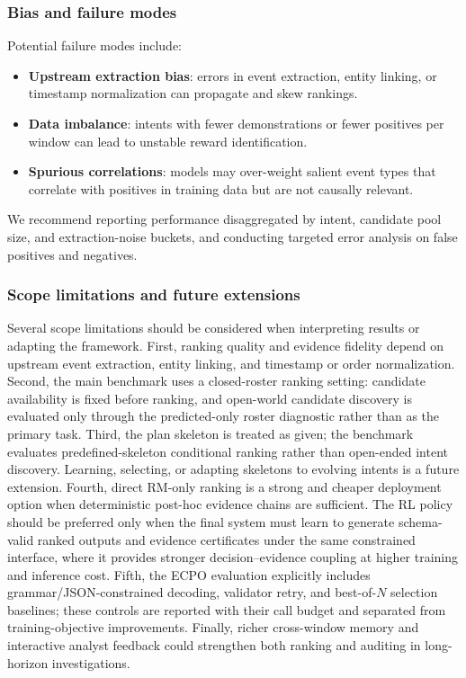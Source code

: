 \documentclass{article}
\begin{document}
\subsubsection{Bias and failure modes}

Potential failure modes include:
\begin{itemize}
    \item \textbf{Upstream extraction bias}: errors in event extraction, entity linking, or timestamp normalization can propagate and skew rankings.
    \item \textbf{Data imbalance}: intents with fewer demonstrations or fewer positives per window can lead to unstable reward identification.
    \item \textbf{Spurious correlations}: models may over-weight salient event types that correlate with positives in training data but are not causally relevant.
\end{itemize}
We recommend reporting performance disaggregated by intent, candidate pool size, and extraction-noise buckets, and conducting targeted error analysis on false positives and negatives.

\subsubsection{Scope limitations and future extensions}

Several scope limitations should be considered when interpreting results or adapting the framework.
First, ranking quality and evidence fidelity depend on upstream event extraction, entity linking, and timestamp or order normalization.
Second, the main benchmark uses a closed-roster ranking setting: candidate availability is fixed before ranking, and open-world candidate discovery is evaluated only through the predicted-only roster diagnostic rather than as the primary task.
Third, the plan skeleton is treated as given; the benchmark evaluates predefined-skeleton conditional ranking rather than open-ended intent discovery.
Learning, selecting, or adapting skeletons to evolving intents is a future extension.
Fourth, direct RM-only ranking is a strong and cheaper deployment option when deterministic post-hoc evidence chains are sufficient.
The RL policy should be preferred only when the final system must learn to generate schema-valid ranked outputs and evidence certificates under the same constrained interface, where it provides stronger decision--evidence coupling at higher training and inference cost.
Fifth, the ECPO evaluation explicitly includes grammar/JSON-constrained decoding, validator retry, and best-of-$N$ selection baselines; these controls are reported with their call budget and separated from training-objective improvements.
Finally, richer cross-window memory and interactive analyst feedback could strengthen both ranking and auditing in long-horizon investigations.
\end{document}
